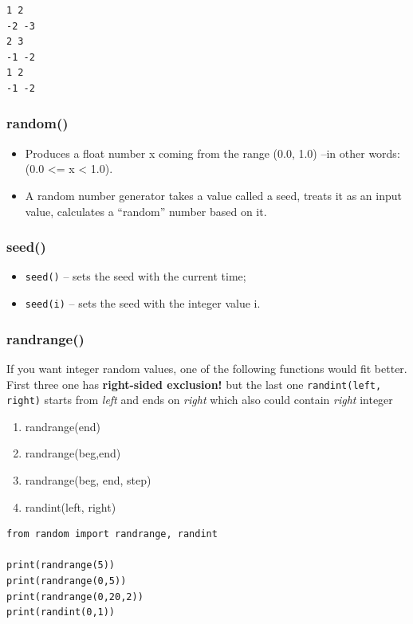 \documentclass[11pt]{article}
\begin{document}
\begin{verbatim}
1 2
-2 -3
2 3
-1 -2
1 2
-1 -2
\end{verbatim}

\subsubsection{random()}
\label{sec:org25ed495}
\begin{itemize}
\item Produces a float number x coming from the range (0.0, 1.0) –in other
words: (0.0 <= x < 1.0).
\item A random number generator takes a value called a seed, treats it as
an input value, calculates a “random” number based on it.
\end{itemize}
\subsubsection{seed()}
\label{sec:org1d5d7c5}
\begin{itemize}
\item \texttt{seed()} – sets the seed with the current time;
\item \texttt{seed(i)} – sets the seed with the integer value i.
\end{itemize}
\subsubsection{randrange()}
\label{sec:org8fa1c6e}
If you want integer random values, one of the following functions
would fit better. First three one has \textbf{right-sided exclusion!} but the
last one \texttt{randint(left, right)} starts from \emph{left} and ends on \emph{right}
which also could contain \emph{right} integer

\begin{enumerate}
\item randrange(end)
\item randrange(beg,end)
\item randrange(beg, end, step)
\item randint(left, right)
\end{enumerate}


\begin{verbatim}
from random import randrange, randint

print(randrange(5))
print(randrange(0,5))
print(randrange(0,20,2))
print(randint(0,1))
\end{verbatim}
\end{document}
